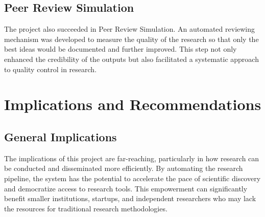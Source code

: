 \subsection{Peer Review Simulation}
The project also succeeded in Peer Review Simulation. An automated reviewing mechanism was developed to measure the quality of the research so that only the best ideas would be documented and further improved. This step not only enhanced the credibility of the outputs but also facilitated a systematic approach to quality control in research.

\section{Implications and Recommendations}
\subsection{General Implications}
The implications of this project are far-reaching, particularly in how research can be conducted and disseminated more efficiently. By automating the research pipeline, the system has the potential to accelerate the pace of scientific discovery and democratize access to research tools. This empowerment can significantly benefit smaller institutions, startups, and independent researchers who may lack the resources for traditional research methodologies.

